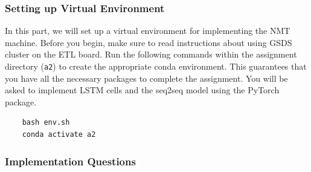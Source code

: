 \documentclass{assignment format}
\begin{document}
\subsubsection{Setting up Virtual Environment}
In this part, we will set up a virtual environment for implementing the NMT machine. Before you begin, make sure to read instructions about using GSDS cluster on the ETL board. Run the following commands within the assignment directory (\texttt{a2}) to create the appropriate conda environment. This guarantees that you have all the necessary packages to complete the assignment. You will be asked to implement LSTM cells and the seq2seq model using the PyTorch package. 
\begin{verbatim}
    bash env.sh
    conda activate a2
\end{verbatim}


\subsubsection{Implementation Questions}
\end{document}
